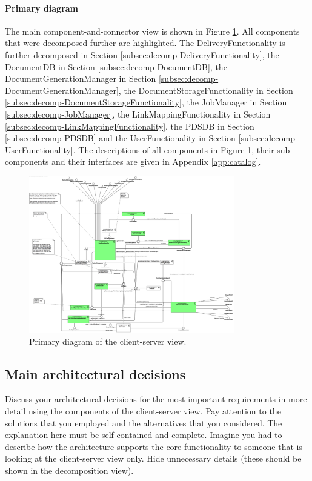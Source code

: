 \documentclass[a4paper,10pt]{article}
\begin{document}
\paragraph{Primary diagram}
The main component-and-connector view is shown in Figure \ref{fig:cs-primary}. All components that were decomposed further are highlighted. The DeliveryFunctionality is further decomposed in Section \ref{subsec:decomp-DeliveryFunctionality}, the DocumentDB in Section \ref{subsec:decomp-DocumentDB}, the DocumentGenerationManager in Section \ref{subsec:decomp-DocumentGenerationManager}, the DocumentStorageFunctionality in Section \ref{subsec:decomp-DocumentStorageFunctionality}, the JobManager in Section \ref{subsec:decomp-JobManager}, the LinkMappingFunctionality in Section \ref{subsec:decomp-LinkMappingFunctionality}, the PDSDB in Section \ref{subsec:decomp-PDSDB} and the UserFunctionality in Section \ref{subsec:decomp-UserFunctionality}. The descriptions of all components in Figure \ref{fig:cs-primary}, their sub-components and their interfaces are given in Appendix \ref*{app:catalog}.

\begin{figure}[!htp]
	\centering
	\includegraphics[width=0.8\textwidth]{ClientServerView.png}
	\caption{Primary diagram of the client-server view.}
	\label{fig:cs-primary}
\end{figure}
\FloatBarrier

\subsection{Main architectural decisions}
Discuss your architectural decisions for the most important requirements in
more detail using the components of the client-server view.
Pay attention to the solutions that you employed and the alternatives that you
considered.
The explanation here must be self-contained and complete.
Imagine you had to describe how the architecture supports the core
functionality to someone that is looking at the client-server view only.
Hide unnecessary details (these should be shown in the decomposition view).
\end{document}
